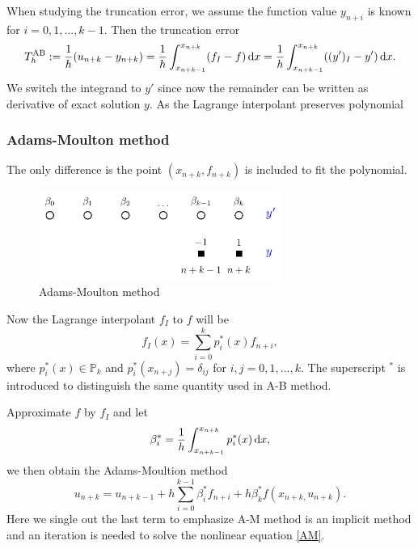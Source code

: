 \documentclass[10pt]{amsart}
\begin{document}
When studying the truncation error, we assume the function value $y_{n+i}$ is known for $i=0,1,\ldots,k-1$. Then the truncation error $$T_h^{\rm AB} := \frac{1}{h} (u_{n+k} - y_{n+k}) = \frac{1}{h} \int_{x_{n+k-1}}^{x_{n+k}} (f_I - f) \,{\rm d}x = \frac{1}{h} \int_{x_{n+k-1}}^{x_{n+k}} ((y')_I - y') \,{\rm d}x.$$
We switch the integrand to $y'$ since now the remainder can be written as derivative of exact solution $y$. As the Lagrange interpolant preserves polynomial  

\subsubsection{Adams-Moulton method}
The only difference is the point $(x_{n+k}, f_{n+k})$ is included to fit the polynomial. 
\begin{figure}[htbp]
\begin{center}
\includegraphics[width=8cm]{figures/AMmethod.pdf}
\caption{Adams-Moulton method}
\label{fig:multistep}
\end{center}
\end{figure}

Now the Lagrange interpolant $f_I$ to $f$ will be 
$$
f_I(x) = \sum_{i=0}^{k}p_i^*(x) f_{n+i},
$$
where $p_i^*(x)\in \mathbb P_{k}$ and $p_i^*(x_{n+j}) = \delta_{ij}$ for $i,j=0,1,\ldots, k$. The superscript $^*$ is introduced to distinguish the same quantity used in A-B method.

Approximate $f$ by $f_I$ and let $$\beta_i^* = \frac{1}{h}\int_{x_{n+k-1}}^{x_{n+k}} p_i^*(x) \,{\rm d}x,$$ we then obtain the Adams-Moultion method
\begin{equation}\label{AM}
u_{n+k} = u_{n+k-1} + h \sum_{i=0}^{k-1}\beta_i^* f_{n+i} + h\beta_k^*f(x_{n+k,} u_{n+k}).
\end{equation}
Here we single out the last term to emphasize A-M method is an implicit method and an iteration is needed to solve the nonlinear equation \eqref{AM}. 




 
\end{document}
